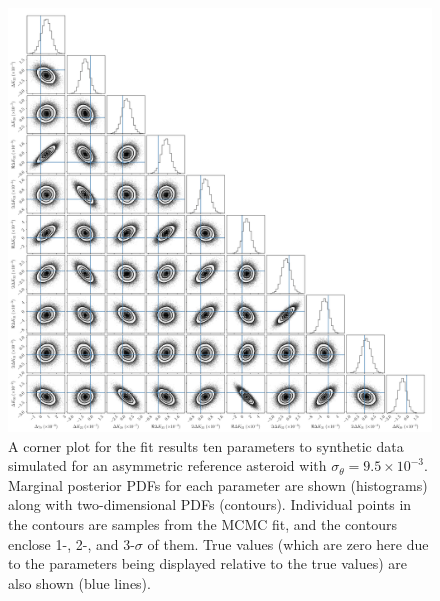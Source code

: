 \documentclass[fleqn,usenatbib]{mnras}
\begin{document}
\begin{figure}
  \centering
  \includegraphics[width=\textwidth]{figs/example-corner.pdf}
  \caption{A corner plot for the fit results ten parameters to synthetic data simulated for an asymmetric reference asteroid with $\sigma_\theta = 9.5 \times 10^{-3}$. Marginal posterior PDFs for each parameter are shown (histograms) along with two-dimensional PDFs (contours). Individual points in the contours are samples from the MCMC fit, and the contours enclose 1-, 2-, and 3-$\sigma$ of them. True values (which are zero here due to the parameters being displayed relative to the true values) are also shown (blue lines).}
  \label{fig:example-corner}
\end{figure}






\bsp	%
\label{lastpage}
\end{document}
